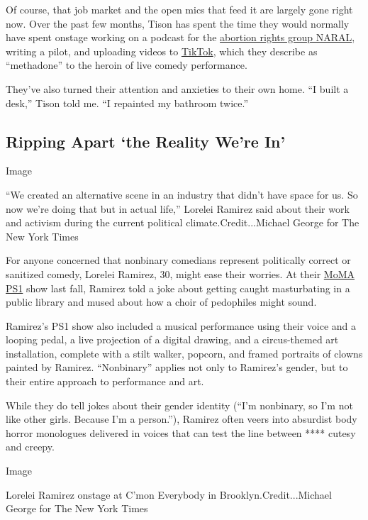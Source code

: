 Of course, that job market and the open mics that feed it are largely
gone right now. Over the past few months, Tison has spent the time they
would normally have spent onstage working on a podcast for the
\href{https://shop.naral.org/products/book}{abortion rights group
NARAL}, writing a pilot, and uploading videos to
\href{https://www.tiktok.com/@james.tison?lang=en}{TikTok}, which they
describe as ``methadone'' to the heroin of live comedy performance.

They've also turned their attention and anxieties to their own home. ``I
built a desk,'' Tison told me. ``I repainted my bathroom twice.''

\hypertarget{ripping-apart-the-reality-were-in}{%
\subsection{Ripping Apart `the Reality We're
In'}\label{ripping-apart-the-reality-were-in}}

Image

``We created an alternative scene in an industry that didn't have space
for us. So now we're doing that but in actual life,'' Lorelei Ramirez
said about their work and activism during the current political
climate.Credit...Michael George for The New York Times

For anyone concerned that nonbinary comedians represent politically
correct or sanitized comedy, Lorelei Ramirez, 30, might ease their
worries. At their \href{https://www.moma.org/calendar/events/5931}{MoMA
PS1} show last fall, Ramirez told a joke about getting caught
masturbating in a public library and mused about how a choir of
pedophiles might sound.

Ramirez's PS1 show also included a musical performance using their voice
and a looping pedal, a live projection of a digital drawing, and a
circus-themed art installation, complete with a stilt walker, popcorn,
and framed portraits of clowns painted by Ramirez. ``Nonbinary'' applies
not only to Ramirez's gender, but to their entire approach to
performance and art.

While they do tell jokes about their gender identity (``I'm nonbinary,
so I'm not like other girls. Because I'm a person.''), Ramirez often
veers into absurdist body horror monologues delivered in voices that can
test the line between **** cutesy and creepy.

Image

Lorelei Ramirez onstage at C'mon Everybody in Brooklyn.Credit...Michael
George for The New York Times

